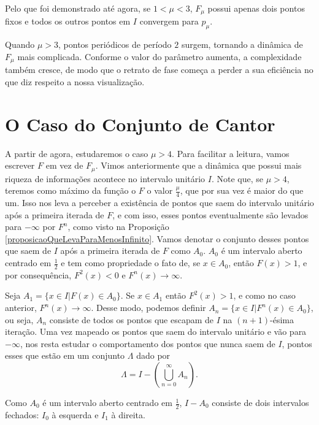 \documentclass[../IC.tex]{subfiles}
\begin{document}
	Pelo que foi demonstrado até agora, se $1<\mu<3$, $F_\mu$ possui apenas dois pontos fixos e todos os outros pontos em $I$ convergem para $p_\mu$.
	
	Quando $\mu > 3$, pontos periódicos de período $2$ surgem, tornando a dinâmica de $F_\mu$ mais complicada. Conforme o valor do parâmetro aumenta, a complexidade também cresce, de modo que o retrato de fase começa a perder a sua eficiência no que diz respeito a nossa visualização.
	
	\section{O Caso do Conjunto de Cantor}
	
	A partir de agora, estudaremos o caso $\mu>4$. Para facilitar a leitura, vamos escrever $F$ em vez de $F_\mu$. Vimos anteriormente que a dinâmica que possui mais riqueza de informações acontece no intervalo unitário $I$. Note que, se $\mu > 4$, teremos como máximo da função o $F$ o valor $\frac{\mu}{4}$, que por sua vez é maior do que um. Isso nos leva a perceber a existência de pontos que saem do intervalo unitário após a primeira iterada de $F$, e com isso, esses pontos eventualmente são levados para $-\infty$ por $F^n$, como visto na Proposição \ref{proposicaoQueLevaParaMenosInfinito}. Vamos denotar o conjunto desses pontos que saem de $I$ após a primeira iterada de $F$ como $A_0$. $A_0$ é um intervalo aberto centrado em $\frac{1}{2}$ e tem como propriedade o fato de, se $x \in A_0$, então $F(x) > 1$, e por consequência, $F^2(x) < 0$ e $F^n(x) \rightarrow \infty$.
	
	Seja $A_1 = \{x \in I | F(x) \in A_0\}$. Se $x\in A_1$ então $F^2(x) > 1$, e como no caso anterior, $F^n(x) \rightarrow \infty$. Desse modo, podemos definir $A_n = \{x\in I|F^n(x) \in A_0\}$, ou seja, $A_n$ consiste de todos os pontos que escapam de $I$ na $(n+1)$-ésima iteração. Uma vez mapeado os pontos que saem do intervalo unitário e vão para $-\infty$, nos resta estudar o comportamento dos pontos que nunca saem de $I$, pontos esses que estão em um conjunto $\Lambda$ dado por
	$$\Lambda = I - \left(\bigcup_{n=0}^{\infty} A_n\right).$$

	Como $A_0$ é um intervalo aberto centrado em $\frac{1}{2}$, $I - A_0$ consiste de dois intervalos fechados: $I_0$ à esquerda e $I_1$ à direita.
	
\end{document}
